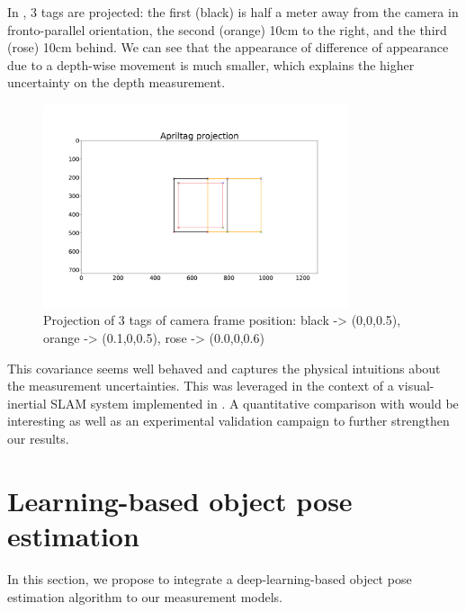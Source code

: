 In , 3 tags are projected: the first (black) is half a meter away from the camera in fronto-parallel orientation, the second (orange)
10cm to the right, and the third (rose) 10cm behind. We can see that the appearance of difference of appearance due to a depth-wise movement is much smaller, which 
explains the higher uncertainty on the depth measurement.

\begin{figure}[h]
    \centering
    \includegraphics[width=0.8\textwidth]{figures/apriltag_proj.pdf}
    \caption{Projection of 3 tags of camera frame position: black -> (0,0,0.5), orange -> (0.1,0,0.5), rose -> (0.0,0,0.6)}
    \label{fig:apriltag_proj}
\end{figure}

This covariance seems well behaved and captures the physical intuitions about the measurement uncertainties. 
This was leveraged in the context of a visual-inertial SLAM system implemented in . 
A quantitative comparison with \cite{urban2016mlpnp} would be interesting as well as an experimental validation campaign to further strengthen our results.


%
%
%
%
\section{Learning-based object pose estimation}
In this section, we propose to integrate a deep-learning-based object pose estimation algorithm \cite{labbe2020cosypose} to our measurement models. 


